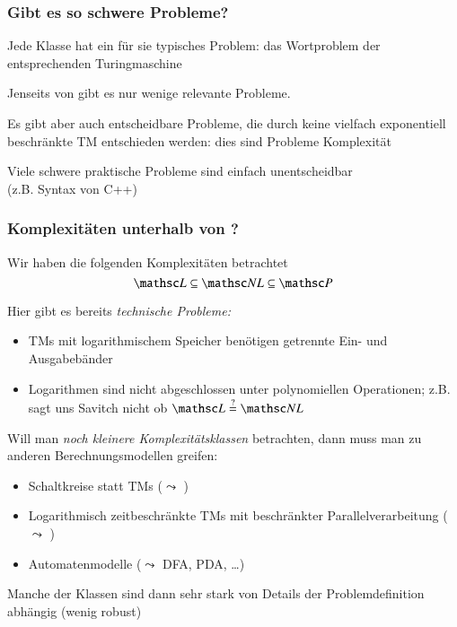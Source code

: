 \documentclass[aspectratio=1610,onlymath]{beamer}
\begin{document}
\begin{frame}\frametitle{Gibt es so schwere Probleme?}\pause

Jede Klasse hat ein für sie typisches Problem: das Wortproblem
der entsprechenden Turingmaschine
\bigskip

Jenseits von \ExpSpace gibt es nur wenige relevante Probleme.\medskip

\pause

Es gibt aber auch entscheidbare Probleme, die durch keine vielfach exponentiell 
beschränkte TM entschieden werden: dies sind Probleme 
Komplexität\medskip

\pause

Viele schwere praktische Probleme sind einfach unentscheidbar\\[-1ex]
{\tiny (z.B. Syntax von C++)}

\end{frame}

\begin{frame}\frametitle{Komplexitäten unterhalb von \PTime?}

Wir haben die folgenden Komplexitäten betrachtet
\[\LogSpace \subseteq \NLogSpace \subseteq \PTime\]

Hier gibt es bereits \emph{technische Probleme:}
\begin{itemize}
\item TMs mit logarithmischem Speicher benötigen getrennte Ein- und Ausgabebänder
\item Logarithmen sind nicht abgeschlossen unter polynomiellen Operationen;
z.B. sagt uns Savitch \alert{nicht} ob $\LogSpace \stackrel{?}{=} \NLogSpace$
\end{itemize}\pause\smallskip

Will man \emph{noch kleinere Komplexitätsklassen} betrachten, dann muss man zu anderen
Berechnungsmodellen greifen:
\begin{itemize}
\item Schaltkreise statt TMs ($\leadsto$ )
\item Logarithmisch zeitbeschränkte TMs mit beschränkter Parallelverarbeitung ($\leadsto$ )
\item Automatenmodelle ($\leadsto$ DFA, PDA, \ldots)
\end{itemize}
Manche der Klassen sind dann sehr stark von Details der Problemdefinition
abhängig (wenig robust)

\end{frame}
\end{document}
